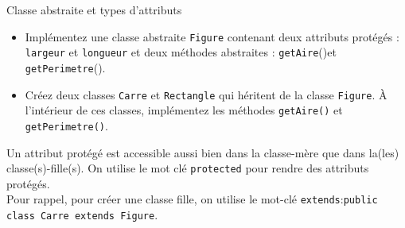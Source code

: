 	
	\begin{Exercice}[15 minutes]{Classe abstraite et types d'attributs}
	\begin{itemize}
		\item Implémentez une classe abstraite \lstinline{Figure} contenant deux attributs protégés : \lstinline{largeur} et \lstinline{longueur} et deux méthodes abstraites : \lstinline{getAire}()et \lstinline{getPerimetre}().
		\item Créez deux classes \lstinline{Carre} et \lstinline{Rectangle} qui héritent de la classe \lstinline{Figure}. À l'intérieur de ces classes, implémentez les méthodes \lstinline{getAire()} et \lstinline{getPerimetre()}.
	\end{itemize}
	
	\begin{conseil}
		Un attribut protégé est accessible aussi bien dans la classe-mère que dans la(les) classe(s)-fille(s). On utilise le mot clé \lstinline{protected} pour rendre des attributs protégés. \\
		Pour rappel, pour créer une classe fille, on utilise le mot-clé \lstinline{extends}:\lstinline{public class Carre extends Figure}.
	\end{conseil}
	
	
	\begin{solution}
	 
	\end{solution}
	\end{Exercice}
	
	\newpage
